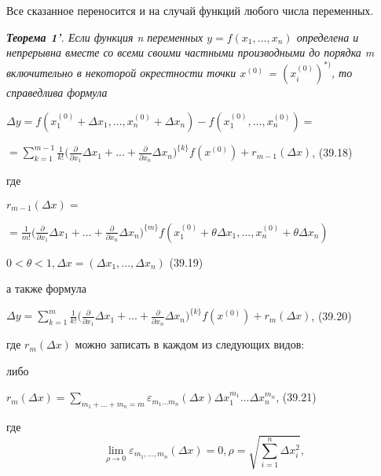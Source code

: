 \documentclass[10 pt]{article}
\begin{document}
	Все сказанное переносится и на случай функций любого числа переменных.
	
	\textit{\textbf{Теорема 1'}. Если функция n переменных $y = f(x_1, ..., x_n)$ определена и непрерывна вместе
	со всеми своими частными производными до порядка m включительно в некоторой окрестности точки
	$x^{(0)}$ = $(x_{i}^{(0)})^{*)}$, то справедлива формула}
	\begin{center}
		$\Delta y = f(x_{1}^{(0)} + \Delta x_{1}, ..., x_{n}^{(0)}+\Delta x_{n}) - f(x_{1}^{(0)}, ...,  x_{n}^{(0)}) =$ 
	\end{center}

	\begin{center}	
		$= \sum\limits_{k = 1}^{m-1} \frac{1}{k!} \bigl( \frac{\partial}{\partial x_1} \Delta x_1 + ... +\frac{\partial}{\partial x_n} \Delta x_n \bigr)^{\{k\}} f(x^{(0)}) + r_{m-1} (\Delta x) $, 
		(39.18)		
	\end{center}
	
	\noindent где
	\begin{center}
		$r_{m-1}(\Delta x) =$
	\end{center} 	
	\begin{center}	
		$=\frac{1}{m!} \bigl( \frac{\partial}{\partial x_1} \Delta x_1 + ... + \frac{\partial}{\partial x_n} \Delta x_n \bigr)^{\{m\}} f(x_{1}^{(0)} + \theta \Delta x_1, ...,x_{n}^{(0)} + \theta \Delta x_n )$
	\end{center} 
	\begin{center}
		$0 < \theta < 1, \Delta x = (\Delta x_1, ...,\Delta x_n)$
		(39.19)
	\end{center} 
		
	\noindent а также формула
	
	 \begin{center}
	$\Delta y  = \sum\limits_{k = 1}^{m} \frac{1}{k!} \bigl( \frac{\partial}{\partial x_1} \Delta x_1 + ... +\frac{\partial}{\partial x_n} \Delta x_n \bigr)^{\{k\}} f(x^{(0)}) + r_{m} (\Delta x) $, (39.20)
	\end{center}
	\noindent где $r_{m} (\Delta x) $ можно записать в каждом из следующих видов:
	
	либо 
	\begin{center}
		$r_{m}(\Delta x) = \sum\limits_{m_1+ ... +m_n = m} \varepsilon_{m_1 ... m_n}(\Delta x) 
		\Delta x_1^{m_1} ... \Delta x_n^{m_n} $, (39.21)
	\end{center} 	
	\noindent где
	$$\lim_{\rho \to 0} \varepsilon_{m_1, ..., m_n}(\Delta x) = 0, 
	\rho = \sqrt{\sum\limits_{i=1}^n \Delta x_i^{2}},$$
	
\end{document}
